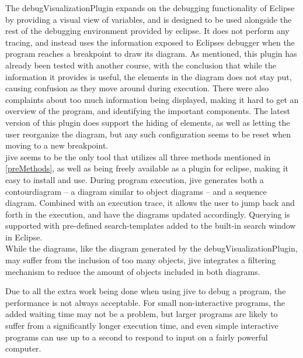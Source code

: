 The \gls{debugVisualizationPlugin} expands on the debugging functionality of Eclipse by providing a visual view of variables, and is designed to be used alongside the rest of the debugging environment provided by eclipse.
It does not perform any tracing, and instead uses the information exposed to Eclipses debugger when the program reaches a breakpoint to draw its diagram.
As mentioned, this plugin has already been tested with another course, with the conclusion that while the information it provides is useful, the elements in the diagram does not stay put, causing confusion as they move around during execution.
There were also complaints about too much information being displayed, making it hard to get an overview of the program, and identifying the important components.
The latest version of this plugin does support the hiding of elements, as well as letting the user reorganize the diagram, but any such configuration seems to be reset when moving to a new breakpoint.
~\\

\Gls{jive} seems to be the only tool that utilizes all three methods mentioned in \autoref{preMethods}, as well as being freely available as a plugin for eclipse, making it easy to install and use.
During program execution, \gls{jive} generates both a \gls{contourdiagram} \cite{Jayaraman1996} -- a diagram similar to object diagrams -- and a sequence diagram.
Combined with an execution trace, it allows the user to jump back and forth in the execution, and have the diagrams updated accordingly.
Querying is supported with pre-defined search-templates added to the built-in search window in Eclipse.
~\\

While the diagrams, like the diagram generated by the \gls{debugVisualizationPlugin}, may suffer from the inclusion of too many objects, \gls{jive} integrates a filtering mechanism to reduce the amount of objects included in both diagrams.


Due to all the extra work being done when using \gls{jive} to debug a program, the performance is not always acceptable.
For small non-interactive programs, the added waiting time may not be a problem, but larger programs are likely to suffer from a significantly longer execution time, and even simple interactive programs can use up to a second to respond to input on a fairly powerful computer.
~\\





